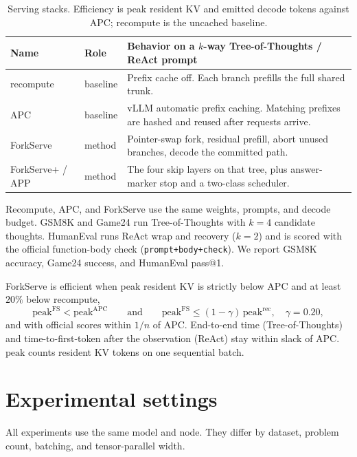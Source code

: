 \documentclass[11pt,a4paper]{article}
\newcommand{\app}{\textsf{APP}\xspace}
\begin{document}
\begin{table}[h]
\centering
\small
\begin{tabular}{@{}llp{}@{}}
\toprule
Name & Role & Behavior on a $k$-way Tree-of-Thoughts / ReAct prompt \\
\midrule
recompute & baseline & Prefix cache off. Each branch prefills the full shared trunk. \\
APC & baseline & vLLM automatic prefix caching. Matching prefixes are hashed and reused after requests arrive. \\
ForkServe & method & Pointer-swap fork, residual prefill, abort unused branches, decode the committed path. \\
ForkServe+ / \app & method & The four skip layers on that tree, plus answer-marker stop and a two-class scheduler. \\
\bottomrule
\end{tabular}
\caption{Serving stacks.
Efficiency is peak resident KV and emitted decode tokens against APC; recompute is the uncached baseline.}
\end{table}

Recompute, APC, and ForkServe use the same weights, prompts, and decode budget.
GSM8K and Game24 run Tree-of-Thoughts with $k{=}4$ candidate thoughts.
HumanEval runs ReAct wrap and recovery ($k{=}2$) and is scored with the official function-body check (\texttt{prompt+body+check}).
We report GSM8K accuracy, Game24 success, and HumanEval pass@1.

ForkServe is efficient when peak resident KV is strictly below APC and at least $20\%$ below recompute,
\begin{equation}
\label{eq:goal}
\mathrm{peak}^{\mathrm{FS}}
  < \mathrm{peak}^{\mathrm{APC}}
\qquad\text{and}\qquad
\mathrm{peak}^{\mathrm{FS}}
  \le (1-\gamma)\,\mathrm{peak}^{\mathrm{rec}},
\quad \gamma{=}0.20,
\end{equation}
and with official scores within $1/n$ of APC.
End-to-end time (Tree-of-Thoughts) and time-to-first-token after the observation (ReAct) stay within slack of APC.
$\mathrm{peak}$ counts resident KV tokens on one sequential batch.

\section{Experimental settings}

All experiments use the same model and node.
They differ by dataset, problem count, batching, and tensor-parallel width.
\end{document}
